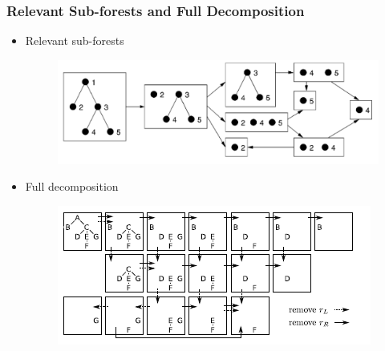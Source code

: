 \documentclass{beamer}
\begin{document}
\begin{frame}
\frametitle{Relevant Sub-forests and Full Decomposition}
\begin{itemize}
\item  Relevant sub-forests
\begin{figure}
	\includegraphics[width=0.6\linewidth]{LeftmostPathDecomposition}
	\centering
\end{figure}
\item Full decomposition
\begin{figure}
	\includegraphics[width=0.6\linewidth]{FullDecomposition}
	\centering
\end{figure}
\end{itemize}
\end{frame}
\end{document}

